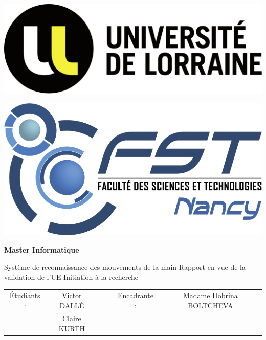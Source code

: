\documentclass[11pt]{article}
\begin{document}
\begin{titlepage}
    \begin{center}

        \begin{minipage}[b]{0.3\textwidth}
            \includegraphics[width=\textwidth]{images/Logo_Universite_de_Lorraine.png}
        \end{minipage}
        \begin{minipage}[b]{0.2\textwidth}
            \centering
            \includegraphics[width=\textwidth]{images/logo-fst-format-jpg-couleur.jpg}
        \end{minipage}
        \smallbreak
        \vspace{0.5cm}
        \textbf{\large Master Informatique}

        \vfill
        {\Large Système de reconnaissance des mouvements de la main} \smallbreak
        Rapport \smallbreak en vue de la validation de l'UE Initiation à la recherche \smallbreak
        \vfill
        \begin{tabular}{ccc|ccc}
            \'Etudiants : & Victor DALL\'E &  &  & Encadrante : & Madame Dobrina BOLTCHEVA \\
                          & Claire KURTH   &  &  &              &
        \end{tabular}
    \end{center}

\end{titlepage}
\end{document}
